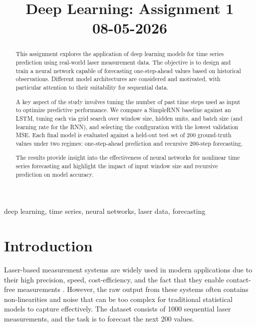 \documentclass[conference]{IEEEtran}
\begin{document}
\title{Deep Learning: Assignment 1\\
{\footnotesize 08-05-2026}
}

\author{
}



\maketitle

\begin{abstract}
This assignment explores the application of deep learning models for time series prediction using real-world laser measurement data. The objective is to design and train a neural network capable of forecasting one-step-ahead values based on historical observations. Different model architectures are considered and motivated, with particular attention to their suitability for sequential data.

A key aspect of the study involves tuning the number of past time steps used as input to optimize predictive performance. We compare a SimpleRNN baseline against an LSTM, tuning each via grid search over window size, hidden units, and batch size (and learning rate for the RNN), and selecting the configuration with the lowest validation MSE. Each final model is evaluated against a held-out test set of 200 ground-truth values under two regimes: one-step-ahead prediction and recursive 200-step forecasting.

The results provide insight into the effectiveness of neural networks for nonlinear time series forecasting and highlight the impact of input window size and recursive prediction on model accuracy.
\end{abstract}

\begin{IEEEkeywords}
deep learning, time series, neural networks, laser data, forecasting
\end{IEEEkeywords}

\section{Introduction}
Laser-based measurement systems are widely used in modern applications due to their high precision, speed, cost-efficiency, and the fact that they enable contact-free measurements \cite{b1}. However, the raw output from these systems often contains non-linearities and noise that can be too complex for traditional statistical models to capture effectively. The dataset consists of 1000 sequential laser measurements, and the task is to forecast the next 200 values.
\end{document}
